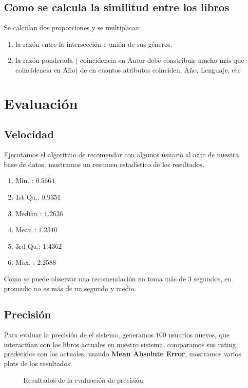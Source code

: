 \documentclass[14pt]{extarticle}
\begin{document}
\subsection{Como se calcula la similitud entre los libros}
Se calculan dos proporciones y se multiplican:

\begin{enumerate}
    \item la razón entre la intersección e unión de sus géneros.
    \item la razón ponderada ( coincidencia en Autor debe constribuir mucho más que coincidencia en Año) de en cuantos atributos coinciden, Año, Lenguaje, etc
\end{enumerate}

\section{Evaluación}
\subsection{Velocidad}

Ejecutamos el algoritmo de recomendar con algunos usuario al azar de nuestra base de datos, mostramos un resumen estadístico de los resultados. 
\begin{enumerate}
    \item Min.   : $0.5664$
    \item 1st Qu.: $0.9351$
    \item  Median : $1.2636  $
    \item Mean   : $1.2310  $
    \item 3rd Qu.: $1.4362 $
    \item Max.   : $2.2588$ 
\end{enumerate}

Como se puede observar una recomendación no toma más de $3$ segundos, en promedio no es más de un segundo y medio.

\subsection{Precisión}

Para evaluar la precisión de el sistema, generamos $100$ usuarios nuevos, que interactúan con los libros actuales en nuestro sistema, comparamos sus rating predecidos con los actuales, usando \textbf{Mean Absolute Error}, mostramos varios plots de los resultados:

\begin{figure}[H]
    \centering
    
    \caption{Resultados de la evaluación de precisión}
    \label{fig:precision-plot}
\end{figure}
\end{document}
